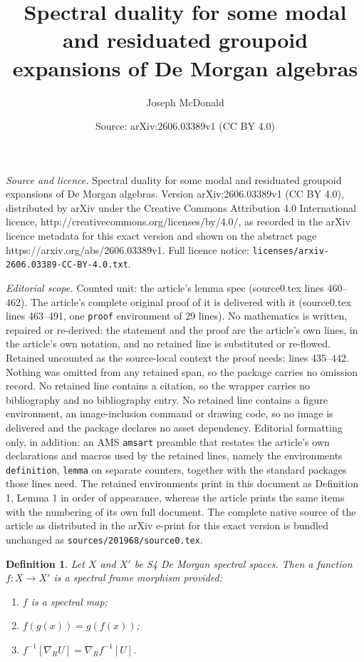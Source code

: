 \documentclass[10pt,a4paper]{amsart}
\title{Spectral duality for some modal and residuated groupoid expansions of De Morgan algebras}
\author{Joseph McDonald}
\date{Source: arXiv:2606.03389v1 (CC BY 4.0)}
\newtheorem{definition}{Definition}
\begin{document}
\maketitle

\noindent\emph{Source and licence.} Spectral duality for some modal and residuated groupoid expansions of De Morgan algebras. Version arXiv:2606.03389v1 (CC BY 4.0), distributed by arXiv under the Creative Commons Attribution 4.0 International licence, http://creativecommons.org/licenses/by/4.0/, as recorded in the arXiv licence metadata for this exact version and shown on the abstract page https://arxiv.org/abs/2606.03389v1. Full licence notice: \texttt{licenses/arxiv-2606.03389-CC-BY-4.0.txt}.\par\smallskip

\noindent\textit{Editorial scope.} Counted unit: the article's lemma spec (source0.tex lines 460--462). The article's complete original proof of it is delivered with it (source0.tex lines 463--491, one \texttt{proof} environment of 29 lines). No mathematics is written, repaired or re-derived: the statement and the proof are the article's own lines, in the article's own notation, and no retained line is substituted or re-flowed.  Retained uncounted as the source-local context the proof needs: lines 435--442.  Nothing was omitted from any retained span, so the package carries no omission record.  No retained line contains a citation, so the wrapper carries no bibliography and no bibliography entry.  No retained line contains a figure environment, an image-inclusion command or drawing code, so no image is delivered and the package declares no asset dependency.  Editorial formatting only, in addition: an AMS \texttt{amsart} preamble that restates the article's own declarations and macros used by the retained lines, namely the environments \texttt{definition}, \texttt{lemma} on separate counters, together with the standard packages those lines need.  The retained environments print in this document as Definition 1, Lemma 1 in order of appearance, whereas the article prints the same items with the numbering of its own full document.  The complete native source of the article as distributed in the arXiv e-print for this exact version is bundled unchanged as \texttt{sources/201968/source0.tex}.
\begin{definition}\label{spectral frame morphism}
    Let $X$ and $X'$ be S4 De Morgan spectral spaces. Then a function $f\colon X\to X'$ is a \emph{spectral frame morphism} provided:
    \begin{enumerate}
        \item $f$ is a spectral map; 
        \item $f(g(x))=g(f(x))$; 
        \item $f^{-1}[\nabla_RU]=\nabla_Rf^{-1}[U]$.  
    \end{enumerate}
\end{definition}
\end{document}
